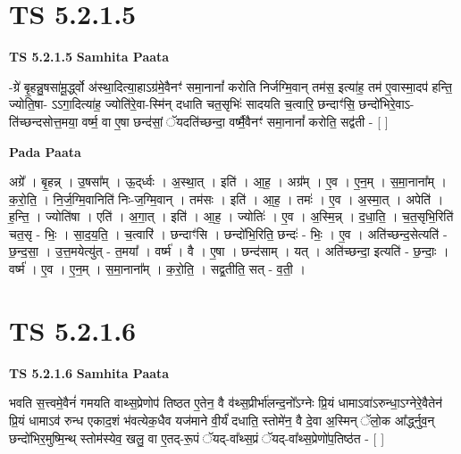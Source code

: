 \documentclass[17pt]{extarticle}
\begin{document}

\section{ TS 5.2.1.5 }

\textbf{TS 5.2.1.5 } \newline
\textbf{Samhita Paata} \newline

-ग्रे॑ बृ॒हन्नु॒षसा॑मू॒र्द्ध्वो अ॑स्था॒दित्या॒हाऽग्र॑मे॒वैनꣳ॑ समा॒नानां᳚ करोति निर्जग्मि॒वान् तम॑स॒ इत्या॑ह॒ तम॑ ए॒वास्मा॒दप॑ हन्ति॒ ज्योति॒षा- ऽऽगा॒दित्या॑ह॒ ज्योति॑रे॒वा-स्मि॑न् दधाति चत॒सृभिः॑ सादयति च॒त्वारि॒ छन्दाꣳ॑सि॒ छन्दो॑भिरे॒वाऽ-ति॑च्छन्दसोत्त॒मया॒ वर्ष्म॒ वा ए॒षा छन्द॑सां॒ ॅयदति॑च्छन्दा॒ वर्ष्मै॒वैनꣳ॑ समा॒नानां᳚ करोति॒ सद्व॑ती - [  ] \newline

\textbf{Pada Paata} \newline

अग्रे᳚ । बृ॒हन्न् । उ॒षसा᳚म् । ऊ॒द्‌र्ध्वः । अ॒स्था॒त् । इति॑ । आ॒ह॒ । अग्र᳚म् । ए॒व । ए॒न॒म् । स॒मा॒नाना᳚म् । क॒रो॒ति॒ । नि॒र्ज॒ग्मि॒वानिति॑ निः-ज॒ग्मि॒वान् । तम॑सः । इति॑ । आ॒ह॒ । तमः॑ । ए॒व । अ॒स्मा॒त् । अपेति॑ । ह॒न्ति॒ । ज्योति॑षा । एति॑ । अ॒गा॒त् । इति॑ । आ॒ह॒ । ज्योतिः॑ । ए॒व । अ॒स्मि॒न्न् । द॒धा॒ति॒ । च॒त॒सृभि॒रिति॑ चत॒सृ - भिः॒ । सा॒द॒य॒ति॒ । च॒त्वारि॑ । छन्दाꣳ॑सि । छन्दो॑भि॒रिति॒ छन्दः॑ - भिः॒ । ए॒व । अति॑च्छन्द॒सेत्यति॑ - छ॒न्द॒सा॒ । उ॒त्त॒मयेत्यु॑त् - त॒मया᳚ । वर्ष्म॑ । वै । ए॒षा । छन्द॑साम् । यत् । अति॑च्छन्दा॒ इत्यति॑ - छ॒न्दाः॒ । वर्ष्म॑ । ए॒व । ए॒न॒म् । स॒मा॒नाना᳚म् । क॒रो॒ति॒ । सद्व॒तीति॒ सत् - व॒ती॒ ।  \newline





\section{ TS 5.2.1.6 }

\textbf{TS 5.2.1.6 } \newline
\textbf{Samhita Paata} \newline

भवति स॒त्त्वमे॒वैनं॑ गमयति वाथ्स॒प्रेणोप॑ तिष्ठत ए॒तेन॒ वै व॑थ्स॒प्रीर्भा॑लन्द॒नो᳚ऽग्नेः प्रि॒यं धामाऽवा॑ऽरुन्धा॒ऽग्नेरे॒वैतेन॑ प्रि॒यं धामाऽव॑ रुन्ध एकाद॒शं भ॑वत्येक॒धैव यज॑माने वी॒र्यं॑ दधाति॒ स्तोमे॑न॒ वै दे॒वा अ॒स्मिन् ॅलो॒क आ᳚र्द्ध्नुव॒न् छन्दो॑भिर॒मुष्मि॒न्थ् स्तोम॑स्येव॒ खलु॒ वा ए॒तद्-रू॒पं ॅयद्-वा᳚थ्स॒प्रं ॅयद्-वा᳚थ्स॒प्रेणो॑प॒तिष्ठ॑त - [  ] \newline
\end{document}
